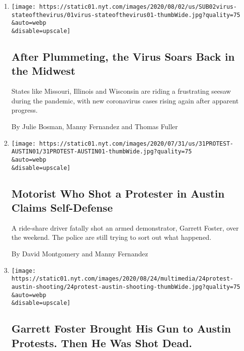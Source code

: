\begin{enumerate}
\def\labelenumi{\arabic{enumi}.}
\item
  \href{/2020/08/01/us/coronavirus-midwest-cases-deaths.html}{}

  \texttt{[image: https://static01.nyt.com/images/2020/08/02/us/SUB02virus-stateofthevirus/01virus-stateofthevirus01-thumbWide.jpg?quality=75\\\&auto=webp\\\&disable=upscale]}

  \hypertarget{after-plummeting-the-virus-soars-back-in-the-midwest}{%
  \subsection{After Plummeting, the Virus Soars Back in the
  Midwest}\label{after-plummeting-the-virus-soars-back-in-the-midwest}}

  States like Missouri, Illinois and Wisconsin are riding a frustrating
  seesaw during the pandemic, with new coronavirus cases rising again
  after apparent progress.

  By Julie Bosman, Manny Fernandez and Thomas Fuller
\item
  \href{/2020/07/31/us/austin-protest-shooting-foster-perry.html}{}

  \texttt{[image: https://static01.nyt.com/images/2020/07/31/us/31PROTEST-AUSTIN01/31PROTEST-AUSTIN01-thumbWide.jpg?quality=75\\\&auto=webp\\\&disable=upscale]}

  \hypertarget{motorist-who-shot-a-protester-in-austin-claims-self-defense}{%
  \subsection{Motorist Who Shot a Protester in Austin Claims
  Self-Defense}\label{motorist-who-shot-a-protester-in-austin-claims-self-defense}}

  A ride-share driver fatally shot an armed demonstrator, Garrett
  Foster, over the weekend. The police are still trying to sort out what
  happened.

  By David Montgomery and Manny Fernandez
\item
  \href{/2020/07/26/us/austin-shooting-texas-protests.html}{}

  \texttt{[image: https://static01.nyt.com/images/2020/08/24/multimedia/24protest-austin-shooting/24protest-austin-shooting-thumbWide.jpg?quality=75\\\&auto=webp\\\&disable=upscale]}

  \hypertarget{garrett-foster-brought-his-gun-to-austin-protests-then-he-was-shot-dead}{%
  \subsection{Garrett Foster Brought His Gun to Austin Protests. Then He
  Was Shot
  Dead.}\label{garrett-foster-brought-his-gun-to-austin-protests-then-he-was-shot-dead}}


\end{enumerate}
